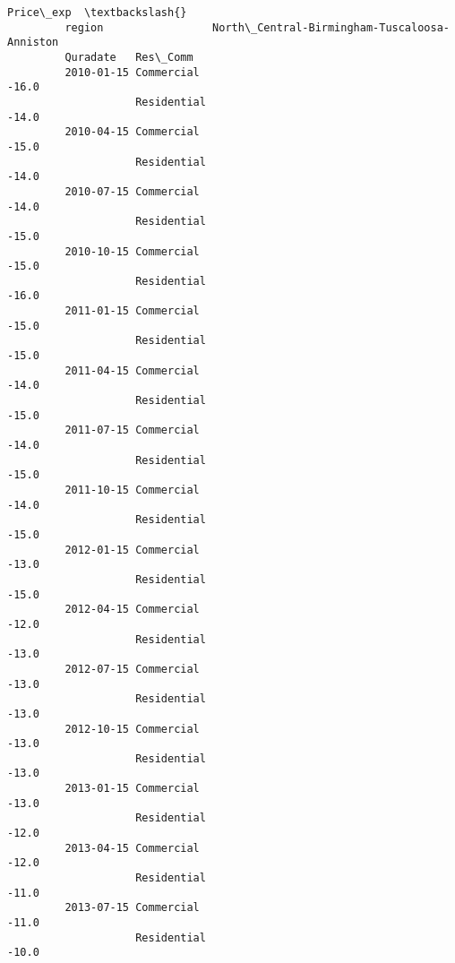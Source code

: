 \documentclass[11pt]{article}
\begin{document}
\begin{Verbatim}[commandchars=\\\{\}]
                                                                   Price\_exp  \textbackslash{}
         region                 North\_Central-Birmingham-Tuscaloosa-Anniston   
         Quradate   Res\_Comm                                                   
         2010-01-15 Commercial                                         -16.0   
                    Residential                                        -14.0   
         2010-04-15 Commercial                                         -15.0   
                    Residential                                        -14.0   
         2010-07-15 Commercial                                         -14.0   
                    Residential                                        -15.0   
         2010-10-15 Commercial                                         -15.0   
                    Residential                                        -16.0   
         2011-01-15 Commercial                                         -15.0   
                    Residential                                        -15.0   
         2011-04-15 Commercial                                         -14.0   
                    Residential                                        -15.0   
         2011-07-15 Commercial                                         -14.0   
                    Residential                                        -15.0   
         2011-10-15 Commercial                                         -14.0   
                    Residential                                        -15.0   
         2012-01-15 Commercial                                         -13.0   
                    Residential                                        -15.0   
         2012-04-15 Commercial                                         -12.0   
                    Residential                                        -13.0   
         2012-07-15 Commercial                                         -13.0   
                    Residential                                        -13.0   
         2012-10-15 Commercial                                         -13.0   
                    Residential                                        -13.0   
         2013-01-15 Commercial                                         -13.0   
                    Residential                                        -12.0   
         2013-04-15 Commercial                                         -12.0   
                    Residential                                        -11.0   
         2013-07-15 Commercial                                         -11.0   
                    Residential                                        -10.0   

\end{Verbatim}
\end{document}
